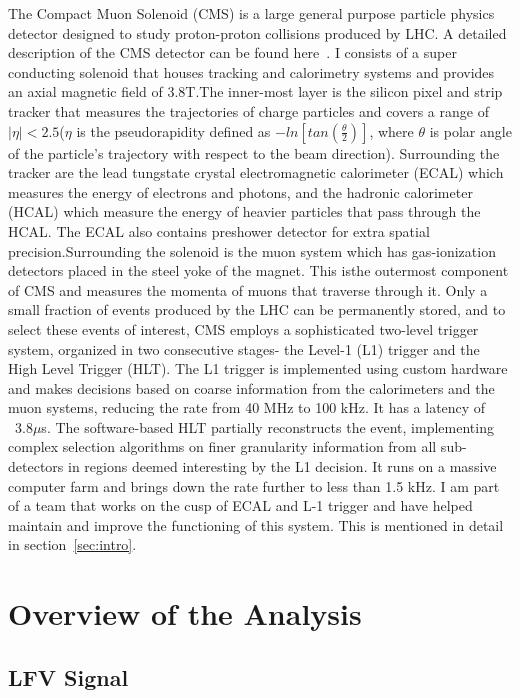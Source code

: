 \documentclass[a4paper,11pt]{article}
\begin{document}
The Compact Muon Solenoid (CMS) is a large general purpose particle physics  detector  designed to study proton-proton collisions produced by LHC. A detailed description of the CMS detector can be found here~\cite{g}. I consists of a super conducting solenoid that houses tracking and calorimetry systems and provides an axial magnetic field of 3.8T.The inner-most layer is the silicon pixel and strip tracker that measures the trajectories of charge particles and covers a range of $|\eta|<2.5$($\eta$ is the pseudorapidity defined as $-ln[tan(\frac{\theta}{2})]$, where $\theta$ is polar angle of the particle's trajectory with respect to the beam direction). Surrounding the tracker are the lead tungstate crystal electromagnetic calorimeter (ECAL) which measures the energy of electrons and photons, and the hadronic calorimeter (HCAL) which measure the energy of heavier particles that pass through the HCAL. The ECAL also contains preshower detector for extra spatial precision.Surrounding the solenoid is the muon system which has gas-ionization detectors placed in the steel yoke of the magnet. This isthe outermost component of CMS and measures the momenta of muons that traverse through it.   
Only a small fraction of events produced by the LHC can be permanently stored, and to select these events of interest, CMS employs a sophisticated two-level trigger system, organized in two consecutive stages- the Level-1 (L1) trigger and the High Level Trigger (HLT). The L1 trigger is implemented using custom hardware and makes decisions based on coarse information from the calorimeters and the muon systems, reducing the rate from 40 MHz to 100 kHz. It has a latency of ~3.8$\mu$s. The software-based HLT partially reconstructs the event, implementing complex selection algorithms on finer granularity information from all sub-detectors in regions deemed interesting by the L1 decision. It runs on a massive computer farm and brings down the rate further to less than 1.5 kHz. I am part of a team that works on the cusp of ECAL and L-1 trigger and have helped maintain and improve the functioning of this system. This is mentioned in detail in section~\ref{sec:intro}.


\section {Overview of the Analysis}
\subsection{LFV Signal}
\end{document}
